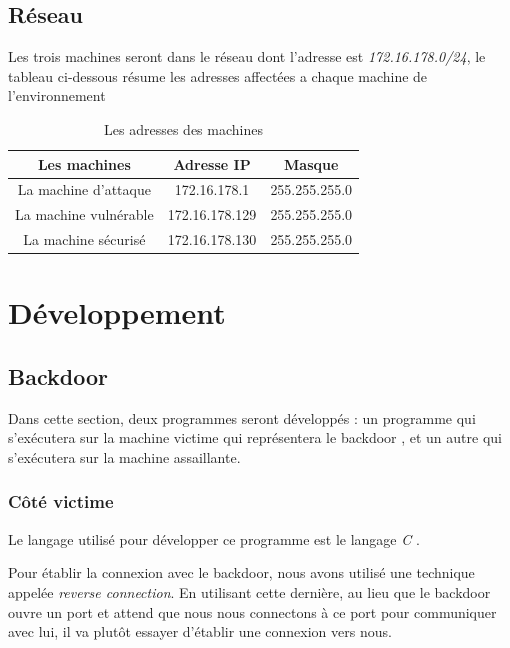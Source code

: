 \subsection{Réseau}
    Les trois machines seront dans le réseau dont l'adresse est \emph{172.16.178.0/24}, le tableau ci-dessous résume les adresses affectées a chaque machine de l'environnement
\begin{table}[h] %

    \begin{center} %

    \begin{tabular}{|c|c|c|}
    \hline
    Les machines & Adresse IP & Masque \\
    \hline
    La machine d'attaque & 172.16.178.1 & 255.255.255.0 \\
    \hline
    La machine vulnérable & 172.16.178.129 & 255.255.255.0 \\
    \hline
    La machine sécurisé & 172.16.178.130 & 255.255.255.0 \\
    \hline
    \end{tabular}

    \caption{Les adresses des machines} %
    \label{adresses_machines} %

    \end{center}
\end{table}

\section{Développement}
    \subsection{Backdoor}
    Dans cette section, deux programmes seront développés : un programme qui s'exécutera sur la machine victime
    qui représentera le backdoor , et un autre qui s'exécutera sur la machine assaillante. %
        \subsubsection{Côté victime}
        Le langage utilisé pour développer ce programme est le langage \emph{C} \cite{C}.

        Pour établir la connexion avec le backdoor, nous avons utilisé une technique appelée \emph{reverse connection}. 
        En utilisant cette dernière, au lieu que le backdoor ouvre un port et attend que nous nous  connectons à ce 
        port pour communiquer avec lui, il va plutôt essayer d'établir une connexion vers nous. 

